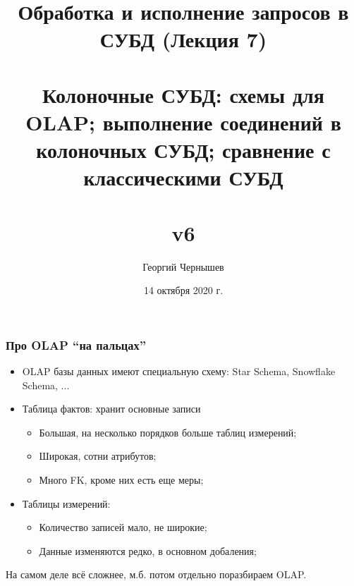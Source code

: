 \documentclass{beamer}
\title[Обработка и исполнение запросов: лекция 7]{Обработка и исполнение запросов в СУБД (Лекция 7) \\~\\ Колоночные СУБД: схемы для OLAP; выполнение соединений в колоночных СУБД; сравнение с классическими СУБД\\~\\ v6} %
\author{Георгий Чернышев} %
\institute[ВШЭ] %
{
Высшая Школа Экономики \\ %
\medskip
\textit{chernishev@gmail.com} %
}
\date{14 октября 2020 г.}
\begin{document}
\begin{frame}
\titlepage %
\end{frame}

\begin{frame}
\frametitle{Про OLAP ``на пальцах''}


\begin{itemize}
  \setlength\itemsep{1em}
  \item OLAP базы данных имеют специальную схему: Star Schema, Snowflake Schema, ...
  \item Таблица фактов: хранит основные записи
  \begin{itemize}
    \item Большая, на несколько порядков больше таблиц измерений;
    \item Широкая, сотни атрибутов;
    \item Много FK, кроме них есть еще меры;
  \end{itemize}
  \item Таблицы измерений: 
  \begin{itemize}
    \item Количество записей мало, не широкие;
    \item Данные изменяются редко, в основном добаления;
  \end{itemize}
  
\end{itemize}

На самом деле всё сложнее, м.б. потом отдельно поразбираем OLAP.

\end{frame}
\end{document}
